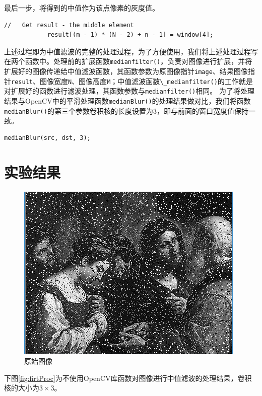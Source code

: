 \documentclass[a4paper]{ctexrep}
\begin{document}
最后一步，将得到的中值作为该点像素的灰度值。

\begin{lstlisting}
//   Get result - the middle element
			result[(m - 1) * (N - 2) + n - 1] = window[4];
\end{lstlisting}

上述过程即为中值滤波的完整的处理过程，为了方便使用，我们将上述处理过程写在两个函数中。处理前的扩展函数\lstinline{medianfilter()}，负责对图像进行扩展，并将扩展好的图像传递给中值滤波函数，其函数参数为原图像指针\lstinline{image}、结果图像指针\lstinline{result}、图像宽度\lstinline{N}、图像高度\lstinline{M}；中值滤波函数\lstinline{\_medianfilter()}的工作就是对扩展好的函数进行滤波处理，其函数参数与\lstinline{medianfilter()}相同。
为了将处理结果与OpenCV中的平滑处理函数\lstinline{medianBlur()}的处理结果做对比，我们将函数\lstinline{medianBlur()}的第三个参数卷积核的长度设置为3，即与前面的窗口宽度值保持一致。

\begin{lstlisting}
medianBlur(src, dst, 3);
\end{lstlisting}

\section{实验结果}

\begin{figure}
\centering
\includegraphics{img/originalImage.PNG}
\caption{原始图像}
\label {fig:previous}
\end{figure}

下图\ref {fig:firtProc}为不使用OpenCV库函数对图像进行中值滤波的处理结果，卷积核的大小为$3\times3$。
\end{document}
